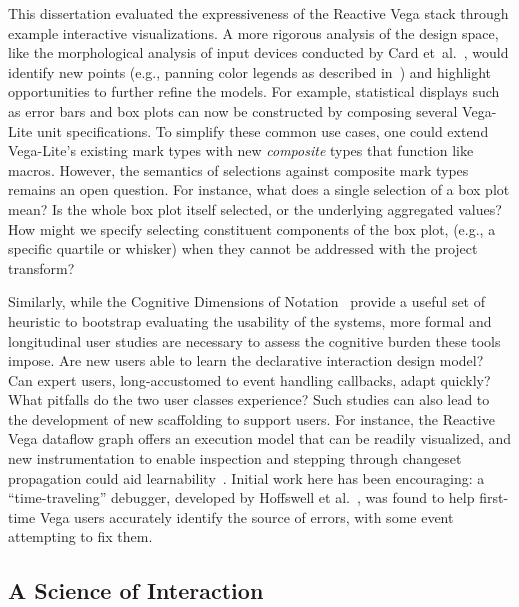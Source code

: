 This dissertation evaluated the expressiveness of the Reactive Vega stack
through example interactive visualizations. A more rigorous analysis of the
design space, like the morphological analysis of input devices conducted by Card
et~al.~\cite{card:morphological}, would identify new points (e.g., panning color
legends as described in~) and highlight opportunities to
further refine the models. For example, statistical displays such as error bars
and box plots can now be constructed by composing several Vega-Lite unit
specifications. To simplify these common use cases, one could extend Vega-Lite's
existing mark types with new \emph{composite} types that function like macros.
However, the semantics of selections against composite mark types remains an
open question. For instance, what does a single selection of a box plot mean? Is
the whole box plot itself selected, or the underlying aggregated values? How
might we specify selecting constituent components of the box plot, (e.g., a
specific quartile or whisker) when they cannot be addressed with the project
transform?

Similarly, while the Cognitive Dimensions of Notation~\cite{blackwell:cogdim}
provide a useful set of heuristic to bootstrap evaluating the usability of the
systems, more formal and longitudinal user studies are necessary to assess the
cognitive burden these tools impose. Are new users able to learn the declarative
interaction design model? Can expert users, long-accustomed to event handling
callbacks, adapt quickly? What pitfalls do the two user classes experience? Such
studies can also lead to the development of new scaffolding to support users.
For instance, the Reactive Vega dataflow graph offers an execution model that
can be readily visualized, and new instrumentation to enable inspection and
stepping through changeset propagation could aid learnability~\cite{guo:tutor}.
Initial work here has been encouraging: a ``time-traveling'' debugger, developed
by Hoffswell et al.~\cite{hoffswell:debugging}, was found to help first-time
Vega users accurately identify the source of errors, with some event attempting
to fix them.

\vspace{-10pt}

\subsection{A Science of Interaction}

\vspace{-7pt}


